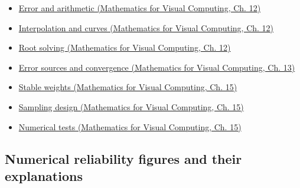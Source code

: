 \begin{itemize}
\tightlist
\item
  \href{../02-Mathematics-for-Visual-Computing/main.pdf\#nameddest=02-foundations-ii-ch028-floating-point-answers-error-conditioning-stability-and-stable-arithmetic}{Error and arithmetic (Mathematics for Visual Computing, Ch. 12)}
\item
  \href{../02-Mathematics-for-Visual-Computing/main.pdf\#nameddest=02-foundations-ii-ch028-reconstructing-values-and-curves-between-samples}{Interpolation and curves (Mathematics for Visual Computing, Ch. 12)}
\item
  \href{../02-Mathematics-for-Visual-Computing/main.pdf\#nameddest=02-foundations-ii-ch028-finding-roots-with-guarantees-and-convergence-checks}{Root solving (Mathematics for Visual Computing, Ch. 12)}
\item
  \href{../02-Mathematics-for-Visual-Computing/main.pdf\#nameddest=02-foundations-ii-ch029-separate-discretization-truncation-and-roundoff-measure-convergence}{Error sources and convergence (Mathematics for Visual Computing, Ch. 13)}
\item
  \href{../02-Mathematics-for-Visual-Computing/main.pdf\#nameddest=02-foundations-ii-ch031-keep-probability-weights-stable-before-sampling}{Stable weights (Mathematics for Visual Computing, Ch. 15)}
\item
  \href{../02-Mathematics-for-Visual-Computing/main.pdf\#nameddest=02-foundations-ii-ch031-design-samples-without-replacement-stratified-and-low-discrepancy}{Sampling design (Mathematics for Visual Computing, Ch. 15)}
\item
  \href{../02-Mathematics-for-Visual-Computing/main.pdf\#nameddest=02-foundations-ii-ch031-test-numerical-methods-and-benchmark-reproducibly}{Numerical tests (Mathematics for Visual Computing, Ch. 15)}
\end{itemize}

\subsection{Numerical reliability figures and their explanations}\label{appendix-cb5af353ef77-numerical-reliability-figures-and-their-explanations}

\hypertarget{appendix-cb5af353ef77-numerical-reliability-figures-and-their-explanations}{}

